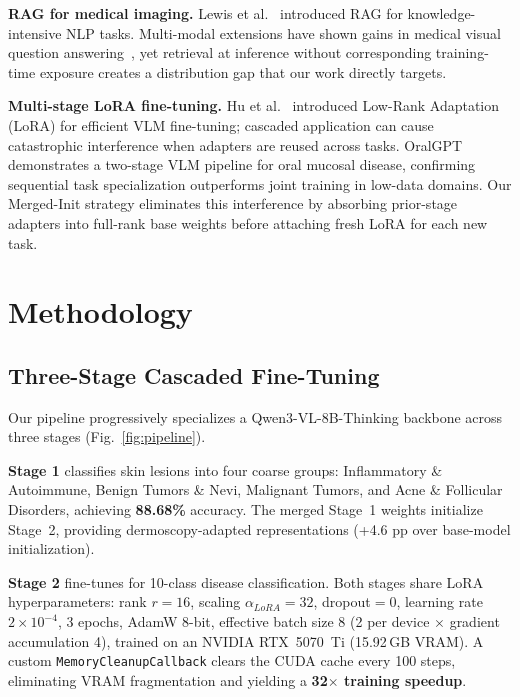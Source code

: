 \documentclass[conference,a4paper]{IEEEtran}
\begin{document}
\textbf{RAG for medical imaging.}
Lewis et al.~\cite{lewis2020} introduced RAG for knowledge-intensive NLP
tasks. Multi-modal extensions have shown gains in medical visual question
answering~\cite{jin2023medcpt}, yet retrieval at inference without
corresponding training-time exposure creates a distribution gap that
our work directly targets.

\textbf{Multi-stage LoRA fine-tuning.}
Hu et al.~\cite{hu2022lora} introduced Low-Rank Adaptation (LoRA) for
efficient VLM fine-tuning; cascaded application can cause catastrophic
interference when adapters are reused across tasks.
OralGPT~\cite{zhang2025oralgpt} demonstrates a two-stage VLM pipeline
for oral mucosal disease, confirming sequential task specialization
outperforms joint training in low-data domains.
Our Merged-Init strategy eliminates this interference by absorbing
prior-stage adapters into full-rank base weights before attaching fresh
LoRA for each new task.

\section{Methodology}

\subsection{Three-Stage Cascaded Fine-Tuning}

Our pipeline progressively specializes a Qwen3-VL-8B-Thinking backbone
across three stages (Fig.~\ref{fig:pipeline}).

\textbf{Stage 1} classifies skin lesions into four coarse groups:
Inflammatory \& Autoimmune, Benign Tumors \& Nevi, Malignant Tumors, and
Acne \& Follicular Disorders, achieving \textbf{88.68\%} accuracy.
The merged Stage~1 weights initialize Stage~2, providing
dermoscopy-adapted representations (+4.6 pp over base-model initialization).

\textbf{Stage 2} fine-tunes for 10-class disease classification.
Both stages share LoRA hyperparameters: rank $r{=}16$, scaling
$\alpha_{LoRA}{=}32$, dropout${=}0$, learning rate $2{\times}10^{-4}$,
3 epochs, AdamW 8-bit, effective batch size 8
(2 per device $\times$ gradient accumulation 4), trained on an
NVIDIA RTX~5070~Ti (15.92\,GB VRAM).
A custom \texttt{MemoryCleanupCallback} clears the CUDA cache every
100 steps, eliminating VRAM fragmentation and yielding a
\textbf{32$\times$ training speedup}.
\end{document}

